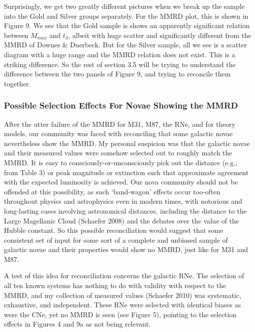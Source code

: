 \documentclass[a4paper,fleqn,usenatbib]{mnras}
\begin{document}
Surprisingly, we get two greatly different pictures when we break up the sample into the Gold and Silver groups separately.  For the MMRD plot, this is shown in Figure 9.  We see that the Gold sample is shows an apparently significant relation between $M_{max}$ and $t_3$, albeit with huge scatter and significantly different from the MMRD of Downes \& Duerbeck.  But for the Silver sample, all we see is a scatter diagram with a huge range and the MMRD relation does not exist.  This is a striking difference.  So the rest of section 3.5 will be trying to understand the difference between the two panels of Figure 9, and trying to reconcile them together.

\subsubsection{Possible Selection Effects For Novae Showing the MMRD}

After the utter failure of the MMRD for M31, M87, the RNe, and for theory models, our community was faced with reconciling that some galactic novae nevertheless show the MMRD.  My personal suspicion was that the galactic novae and their measured values were somehow selected out to roughly match the MMRD.  It is easy to consciously-or-unconsciously pick out the distance (e.g., from Table 3) or peak magnitude or extinction such that approximate agreement with the expected luminosity is achieved.  Our nova community should not be offended at this possibility, as such `band-wagon' effects occur too-often throughout physics and astrophysics even in modern times, with notorious and long-lasting cases involving astronomical distances, including the distance to the Large Magellanic Cloud (Schaefer 2008) and the debates over the value of the Hubble constant.  So this possible reconciliation would suggest that some consistent set of input for some sort of a complete and unbiased sample of galactic novae and their properties would show no MMRD, just like for M31 and M87.  

A test of this idea for reconciliation concerns the galactic RNe.  The selection of all ten known systems has nothing to do with validity with respect to the MMRD, and my collection of measured values (Schaefer 2010) was systematic, exhaustive, and independent.  These RNe were selected with identical biases as were the CNe, yet no MMRD is seen (see Figure 5), pointing to the selection effects in Figures 4 and 9a as not being relevant.
\end{document}
